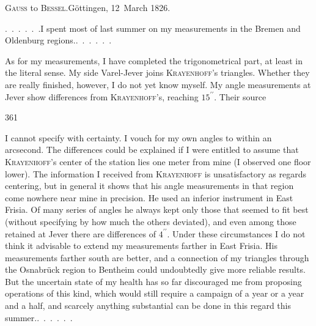\begin{center}
\textsc{Gauss} to \textsc{Bessel}.\quad Göttingen, 12~March 1826.
\end{center}

\par\noindent\hspace*{\parindent}.\ .\ .\ .\ .\ .\quad I spent most of last summer on my measurements in the Bremen and Oldenburg regions.\quad.\ .\ .\ .\ .\ .

\par\noindent\hspace*{\parindent}As for my measurements, I have completed the trigonometrical part, at least in the literal sense. My side Varel-Jever joins \textsc{Krayenhoff}'s triangles.
Whether they are really finished, however, I do not yet know myself.
My angle measurements at Jever show  differences from \textsc{Krayenhoff}'s, reaching \(15^{\prime\prime}\).
Their source
\par\clearpage
{}\hfill361\par\medskip
\noindent I cannot specify with certainty.
I vouch for my own angles to within an arcsecond.
The differences could be explained if I were entitled to assume that \textsc{Krayenhoff}'s center of the station lies one meter from mine (I observed one floor lower).
The information I received from \textsc{Krayenhoff} is unsatisfactory as regards centering, but in general it shows that his angle measurements in that region come nowhere near mine in precision.
He used an inferior instrument in East Frisia. Of many series of angles he always kept only those that seemed to fit best (without specifying by how much the others deviated), and even among those retained at Jever there are differences of \(4^{\prime\prime}\).
Under these circumstances I do not think it advisable to extend my measurements farther in East Frisia.
His measurements farther south are better, and a connection of my triangles through the Osnabrück region to Bentheim could undoubtedly give more reliable results.
But the uncertain state of my health has so far discouraged me from proposing operations of this kind, which would still require a campaign of a year or a year and a half, and scarcely anything substantial can be done in this regard this summer.\quad.\ .\ .\ .\ .\ .

